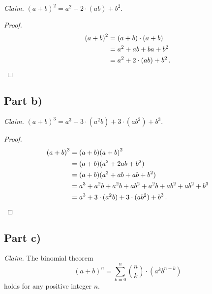 \documentclass{abrice}
\begin{document}
\emph{Claim.} ${(a + b)}^2 = a^2 + 2 \cdot (ab) + b^2$.

\begin{proof}
  \begin{align*}
    {(a + b)}^2
    &= (a + b) \cdot (a + b) \\
    &= a^2 + ab + ba + b^2 \\
    &= a^2 + 2 \cdot (ab) + b^2\, . \qedhere
  \end{align*}
\end{proof}

\subsection{Part b)}

\emph{Claim.} ${(a + b)}^3 = a^3 + 3 \cdot (a^2b) + 3 \cdot (ab^2) + b^3$.

\begin{proof}
  \begin{align*}
    {(a + b)}^3
    &= (a + b){(a + b)}^2 \\
    &= (a + b)(a^2 + 2ab + b^2) \\
    &= (a + b)(a^2 + ab + ab + b^2) \\
    &= a^3 + a^2 b + a^2 b + a b^2 + a^2 b + a b^2 + a b^2 + b^3 \\
    &= a^3 + 3 \cdot (a^2b) + 3 \cdot (ab^2) + b^3\, . \qedhere
  \end{align*}
\end{proof}

\subsection{Part c)}

\emph{Claim.} The binomial theorem
\[
  {(a + b)}^n = \sum_{k=0}^n {n \choose k} \cdot (a^k b^{n-k})
\]
holds for any positive integer $n$.
\end{document}
